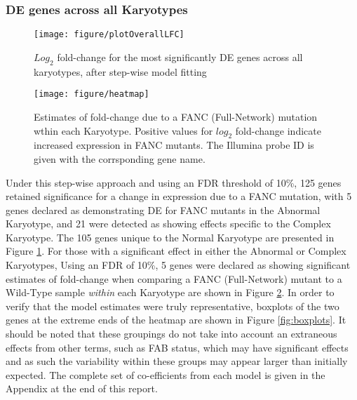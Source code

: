 \documentclass{article}\usepackage{knitr}
\begin{document}
\subsubsection{DE genes across all Karyotypes}\label{sec:Karyo}
\begin{knitrout}
\color{fgcolor}\begin{figure}[]


{\centering \texttt{[image: figure/plotOverallLFC]} 

}

\caption[$Log_2$ fold-change for the most significantly DE genes across all karyotypes, after step-wise model fitting]{$Log_2$ fold-change for the most significantly DE genes across all karyotypes, after step-wise model fitting\label{fig:plotOverallLFC}}
\end{figure}


\end{knitrout}
\begin{knitrout}
\color{fgcolor}\begin{figure}[]


{\centering \texttt{[image: figure/heatmap]} 

}

\caption[Estimates of fold-change due to a FANC (Full-Network) mutation wthin each Karyotype]{Estimates of fold-change due to a FANC (Full-Network) mutation wthin each Karyotype. Positive values for $log_2$ fold-change indicate increased expression in FANC mutants. The Illumina probe ID is given with the corrsponding gene name.\label{fig:heatmap}}
\end{figure}


\end{knitrout}
Under this step-wise approach and using an FDR threshold of 10\%, 125 genes retained significance for a change in expression due to a FANC mutation, with 5 genes declared as demonstrating DE for FANC mutants in the Abnormal Karyotype, and 21 were detected as showing effects specific to the Complex Karyotype.
The 105 genes unique to the Normal Karyotype are presented in Figure \ref{fig:plotOverallLFC}.
For those with a significant effect in either the Abnormal or Complex Karyotypes, 
Using an FDR of 10\%, 5 genes were declared as showing significant estimates of fold-change when comparing a FANC (Full-Network) mutant to a Wild-Type sample \textit{within} each Karyotype are shown in Figure \ref{fig:heatmap}.
In order to verify that the model estimates were truly representative, boxplots of the two genes at the extreme ends of the heatmap are shown in Figure \ref{fig:boxplots}.
It should be noted that these groupings do not take into account an extraneous effects from other terms, such as FAB status, which may have significant effects and as such the variability within these groups may appear larger than initially expected.
The complete set of co-efficients from each model is given in the Appendix at the end of this report.
\end{document}
